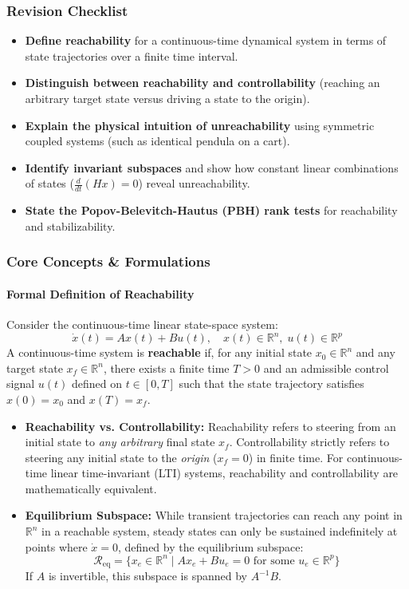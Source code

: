 \documentclass[12pt,onecolumn,twoside ]{article}
\begin{document}
	\subsubsection{Revision Checklist}
	\begin{itemize}
		\item[$\square$]
		\textbf{Define reachability} for a continuous-time dynamical system in terms of state trajectories over a finite time interval.
		\item[$\square$]
		\textbf{Distinguish between reachability and controllability} (reaching an arbitrary target state versus driving a state to the origin).
		\item[$\square$]
		\textbf{Explain the physical intuition of unreachability} using symmetric coupled systems (such as identical pendula on a cart).
		\item[$\square$]
		\textbf{Identify invariant subspaces} and show how constant linear combinations of states ($\frac{d}{dt}(Hx) = 0$) reveal unreachability.
		\item[$\square$]
		\textbf{State the Popov-Belevitch-Hautus (PBH) rank tests} for reachability and stabilizability.
	\end{itemize}
	
	\subsubsection{Core Concepts \& Formulations}
	\paragraph{Formal Definition of Reachability}
	Consider the continuous-time linear state-space system: \[
	\dot{x}(t) = Ax(t) + Bu(t), \quad x(t) \in \mathbb{R}^n,\; u(t) \in \mathbb{R}^p
	\]
	A continuous-time system is \textbf{reachable} if, for any initial state $x_0 \in \mathbb{R}^n$ and any target state $x_f \in \mathbb{R}^n$, there exists a finite time $T > 0$ and an admissible control signal $u(t)$ defined on $t \in [0, T]$ such that the state trajectory satisfies $x(0) = x_0$ and $x(T) = x_f$.
	\begin{itemize}
		\item
		\textbf{Reachability vs. Controllability:} Reachability refers to steering from an initial state to \textit{any arbitrary} final state $x_f$. Controllability strictly refers to steering any initial state to the \textit{origin} ($x_f = 0$) in finite time. For continuous-time linear time-invariant (LTI) systems, reachability and controllability are mathematically equivalent.
		\item
		\textbf{Equilibrium Subspace:} While transient trajectories can reach any point in $\mathbb{R}^n$ in a reachable system, steady states can only be sustained indefinitely at points where $\dot{x} = 0$, defined by the equilibrium subspace: \[
		\mathcal{R}_{\text{eq}} = \{x_e \in \mathbb{R}^n \mid Ax_e + Bu_e = 0 \text{ for some } u_e \in \mathbb{R}^p\}
		\] If $A$ is invertible, this subspace is spanned by $A^{-1}B$.
	\end{itemize}
\end{document}
